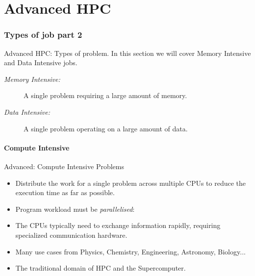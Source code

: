 \part{Advanced HPC}

\section{Types of job part 2}
\begin{frame}{Advanced HPC: Types of problem.}
In this section we will cover Memory Intensive and Data Intensive jobs.
\begin{description}
\item[\textit{Memory Intensive:}]{A single problem requiring a large amount of memory.}
\pause
\item[\textit{Data Intensive:}]{A single problem operating on a large amount of data.}
\end{description}
\end{frame}

\subsection{Compute Intensive}
\begin{frame}{Advanced: Compute Intensive Problems}
\begin{itemize}
\item{Distribute the \alert{work} for a \alert{single problem} across multiple CPUs to reduce the execution time as far as possible.}
\pause
\item{Program workload must be \emph{parallelised}:}
\pause
\item{The CPUs typically need to exchange information rapidly, requiring specialized communication hardware.}
\pause
\item{Many use cases from Physics, Chemistry, Engineering, Astronomy, Biology...}
\item{The traditional domain of \alert{HPC} and the \alert{Supercomputer}.}
\end{itemize}
\end{frame}

